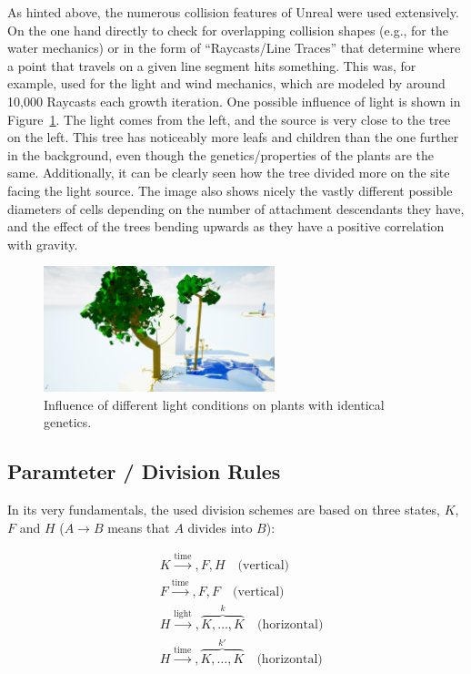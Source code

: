 \documentclass[11pt, abstract=on]{scrartcl}
\begin{document}
As hinted above, the numerous collision features of Unreal were used extensively. On the one hand directly to check for overlapping collision shapes (e.g., for the water mechanics) or in the form of ``Raycasts/Line Traces'' that determine where a point that travels on a given line segment hits something. This was, for example, used for the light and wind mechanics, which are modeled by around 10,000 Raycasts each growth iteration.
One possible influence of light is shown in Figure~\ref{fig:GrowToLight}. The light comes from the left, and the source is very close to the tree on the left. This tree has noticeably more leafs and children than the one further in the background, even though the genetics/properties of the plants are the same. Additionally, it can be clearly seen how the tree divided more on the site facing the light source. The image also shows nicely the vastly different possible diameters of cells depending on the number of attachment descendants they have, and the effect of the trees bending upwards as they have a positive correlation with gravity. 

\begin{figure}
 	 \centering
 	    \includegraphics[width=0.6\textwidth]{SS_GrowToLight.png}
 	 \caption{Influence of different light conditions on plants with identical genetics.}
 	 \label{fig:GrowToLight}
\end{figure}

\subsection{Paramteter / Division Rules}
In its very fundamentals, the used division schemes are based on three states, $K$, $F$ and $H$ ($A \rightarrow B$ means that $A$ divides into $B$):

\begin{align}
	&K \xrightarrow {\text{time}}, F, H \quad \text{(vertical)} \label{eq:K} \\
	&F \xrightarrow {\text{time}}, F, F \quad \text{(vertical)} \label{eq:F}\\
	&H \xrightarrow {\text{light}}, \overbrace{ K, \ldots , K}^{k} \quad \text{(horizontal)}  \label{eq:HLight} \\
	&H \xrightarrow {\text{time}}, \overbrace{ K, \ldots , K}^{k'} \quad \text{(horizontal)} \label{eq:HTime}
\end{align}
\end{document}
